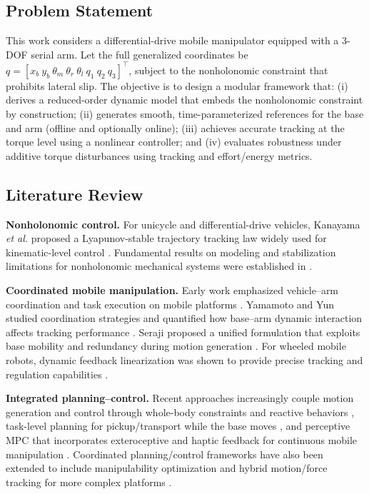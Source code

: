 \documentclass[conference]{IEEEtran}
\begin{document}
\subsection{Problem Statement}
This work considers a differential-drive mobile manipulator equipped with a 3-DOF serial arm. Let the full generalized coordinates be
$q=[x_b~y_b~\theta_m~\theta_r~\theta_l~q_1~q_2~q_3]^\top$,
subject to the nonholonomic constraint that prohibits lateral slip.
The objective is to design a modular framework that:
(i) derives a reduced-order dynamic model that embeds the nonholonomic constraint by construction;
(ii) generates smooth, time-parameterized references for the base and arm (offline and optionally online);
(iii) achieves accurate tracking at the torque level using a nonlinear controller; and
(iv) evaluates robustness under additive torque disturbances using tracking and effort/energy metrics.

\subsection{Literature Review}
\noindent\textbf{Nonholonomic control.}
For unicycle and differential-drive vehicles, Kanayama \emph{et al.} proposed a Lyapunov-stable trajectory tracking law widely used for kinematic-level control \cite{kanayamaStableTrackingControl1990a}. Fundamental results on modeling and stabilization limitations for nonholonomic mechanical systems were established in \cite{blochControlStabilizationNonholonomic1992}.

\noindent\textbf{Coordinated mobile manipulation.}
Early work emphasized vehicle--arm coordination and task execution on mobile platforms \cite{khatibMobileManipulatorsExpanding1998}. Yamamoto and Yun studied coordination strategies and quantified how base--arm dynamic interaction affects tracking performance \cite{yamamotoCoordinatingLocomotionManipulation1994,yamamotoEffectDynamicInteraction1996}. Seraji proposed a unified formulation that exploits base mobility and redundancy during motion generation \cite{serajiUnifiedApproachMotion1998}. For wheeled mobile robots, dynamic feedback linearization was shown to provide precise tracking and regulation capabilities \cite{orioloWMRControlDynamic2002}.

\noindent\textbf{Integrated planning--control.}
Recent approaches increasingly couple motion generation and control through whole-body constraints and reactive behaviors \cite{havilandHolisticApproachReactive2022}, task-level planning for pickup/transport while the base moves \cite{thakarManipulatorMotionPlanning2022}, and perceptive MPC that incorporates exteroceptive and haptic feedback for continuous mobile manipulation \cite{pankertPerceptiveModelPredictive2020}. Coordinated planning/control frameworks have also been extended to include manipulability optimization and hybrid motion/force tracking for more complex platforms \cite{zhangCoordinatedPlanningControl2025a}.
\end{document}
